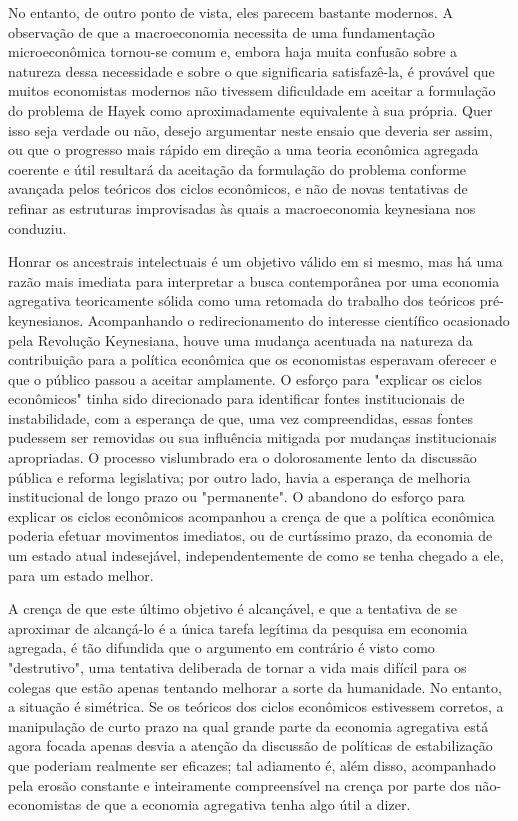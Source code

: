\documentclass[12pt]{article}
\begin{document}
No entanto, de outro ponto de vista, eles parecem bastante modernos. A observação de que a macroeconomia necessita de uma fundamentação microeconômica tornou-se comum e, embora haja muita confusão sobre a natureza dessa necessidade e sobre o que significaria satisfazê-la, é provável que muitos economistas modernos não tivessem dificuldade em aceitar a formulação do problema de Hayek como aproximadamente equivalente à sua própria. Quer isso seja verdade ou não, desejo argumentar neste ensaio que deveria ser assim, ou que o progresso mais rápido em direção a uma teoria econômica agregada coerente e útil resultará da aceitação da formulação do problema conforme avançada pelos teóricos dos ciclos econômicos, e não de novas tentativas de refinar as estruturas improvisadas às quais a macroeconomia keynesiana nos conduziu.

Honrar os ancestrais intelectuais é um objetivo válido em si mesmo, mas há uma razão mais imediata para interpretar a busca contemporânea por uma economia agregativa teoricamente sólida como uma retomada do trabalho dos teóricos pré-keynesianos. Acompanhando o redirecionamento do interesse científico ocasionado pela Revolução Keynesiana, houve uma mudança acentuada na natureza da contribuição para a política econômica que os economistas esperavam oferecer e que o público passou a aceitar amplamente. O esforço para "explicar os ciclos econômicos" tinha sido direcionado para identificar fontes institucionais de instabilidade, com a esperança de que, uma vez compreendidas, essas fontes pudessem ser removidas ou sua influência mitigada por mudanças institucionais apropriadas. O processo vislumbrado era o dolorosamente lento da discussão pública e reforma legislativa; por outro lado, havia a esperança de melhoria institucional de longo prazo ou "permanente". O abandono do esforço para explicar os ciclos econômicos acompanhou a crença de que a política econômica poderia efetuar movimentos imediatos, ou de curtíssimo prazo, da economia de um estado atual indesejável, independentemente de como se tenha chegado a ele, para um estado melhor.

A crença de que este último objetivo é alcançável, e que a tentativa de se aproximar de alcançá-lo é a única tarefa legítima da pesquisa em economia agregada, é tão difundida que o argumento em contrário é visto como "destrutivo", uma tentativa deliberada de tornar a vida mais difícil para os colegas que estão apenas tentando melhorar a sorte da humanidade. No entanto, a situação é simétrica. Se os teóricos dos ciclos econômicos estivessem corretos, a manipulação de curto prazo na qual grande parte da economia agregativa está agora focada apenas desvia a atenção da discussão de políticas de estabilização que poderiam realmente ser eficazes; tal adiamento é, além disso, acompanhado pela erosão constante e inteiramente compreensível na crença por parte dos não-economistas de que a economia agregativa tenha algo útil a dizer.
\end{document}
